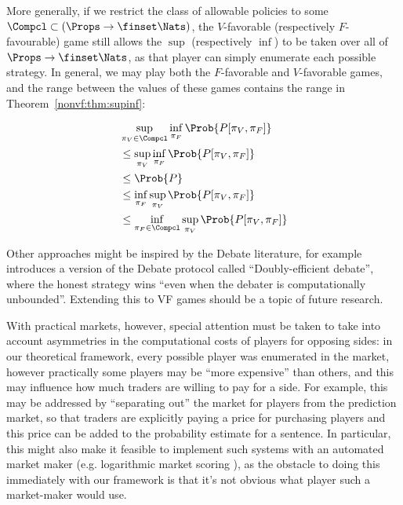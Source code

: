 More generally, if we restrict the class of allowable policies to some $\Compcl\subset(\Props\to\finset\Nats)$, the $V$-favorable (respectively $F$-favourable) game still allows the $\sup$ (respectively $\inf$) to be taken over all of $\Props\to\finset\Nats$, as that player can simply enumerate each possible strategy. In general, we may play both the $F$-favorable and $V$-favorable games, and the range between the values of these games contains the range in Theorem~\ref{nonvf:thm:supinf}:

\begin{align}
&\sup_{\pi_V\in\Compcl}\inf_{\pi_F}\Prob{P[\pi_V,\pi_F]}\nonumber\\
&\le
\sup_{\pi_V}\inf_{\pi_F}\Prob{P[\pi_V,\pi_F]}\nonumber\\
&\le
\Prob{P}\label{nonvf:eq:bounds}\\
&\le
\inf_{\pi_F}\sup_{\pi_V}\Prob{P[\pi_V,\pi_F]}\nonumber\\
&\le
\inf_{\pi_F\in\Compcl}\sup_{\pi_V}\Prob{P[\pi_V,\pi_F]}\nonumber
\end{align}

Other approaches might be inspired by the Debate literature, for example \citet{brown-cohenScalableAISafety2023} introduces a version of the Debate protocol called ``Doubly-efficient debate'', where the honest strategy wins ``even when the debater is computationally unbounded''. Extending this to VF games should be a topic of future research.

With practical markets, however, special attention must be taken to take into account asymmetries in the computational costs of players for opposing sides: in our theoretical framework, every possible player was enumerated in the market, however practically some players may be ``more expensive'' than others, and this may influence how much traders are willing to pay for a side. For example, this may be addressed by ``separating out'' the market for players from the prediction market, so that traders are explicitly paying a price for purchasing players and this price can be added to the probability estimate for a sentence. In particular, this might also make it feasible to implement such systems with an automated market maker (e.g. logarithmic market scoring \citep{hansonLogarithmicMarketScoring2002, hansonCombinatorialInformationMarket2003}), as the obstacle to doing this immediately with our framework is that it's not obvious what player such a market-maker would use.

